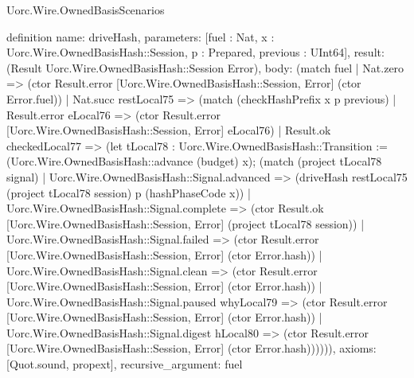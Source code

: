 \begin{lexlean}{Uorc.Wire.OwnedBasisScenarios}
\begin{semanticmodule}
definition{
  name: driveHash,
  parameters: [fuel : Nat, x : Uorc.Wire.OwnedBasisHash::Session, p : Prepared, previous : UInt64],
  result: (Result Uorc.Wire.OwnedBasisHash::Session Error),
  body: (match fuel
    | Nat.zero => (ctor Result.error [Uorc.Wire.OwnedBasisHash::Session, Error] (ctor Error.fuel))
    | Nat.succ restLocal75 => (match (checkHashPrefix x p previous)
      | Result.error eLocal76 => (ctor Result.error [Uorc.Wire.OwnedBasisHash::Session, Error] eLocal76)
      | Result.ok checkedLocal77 => (let tLocal78 : Uorc.Wire.OwnedBasisHash::Transition := (Uorc.Wire.OwnedBasisHash::advance (budget) x); (match (project tLocal78 signal)
        | Uorc.Wire.OwnedBasisHash::Signal.advanced => (driveHash restLocal75 (project tLocal78 session) p (hashPhaseCode x))
        | Uorc.Wire.OwnedBasisHash::Signal.complete => (ctor Result.ok [Uorc.Wire.OwnedBasisHash::Session, Error] (project tLocal78 session))
        | Uorc.Wire.OwnedBasisHash::Signal.failed => (ctor Result.error [Uorc.Wire.OwnedBasisHash::Session, Error] (ctor Error.hash))
        | Uorc.Wire.OwnedBasisHash::Signal.clean => (ctor Result.error [Uorc.Wire.OwnedBasisHash::Session, Error] (ctor Error.hash))
        | Uorc.Wire.OwnedBasisHash::Signal.paused whyLocal79 => (ctor Result.error [Uorc.Wire.OwnedBasisHash::Session, Error] (ctor Error.hash))
        | Uorc.Wire.OwnedBasisHash::Signal.digest hLocal80 => (ctor Result.error [Uorc.Wire.OwnedBasisHash::Session, Error] (ctor Error.hash)))))),
  axioms: [Quot.sound, propext],
  recursive_argument: fuel
}


\end{semanticmodule}
\end{lexlean}
